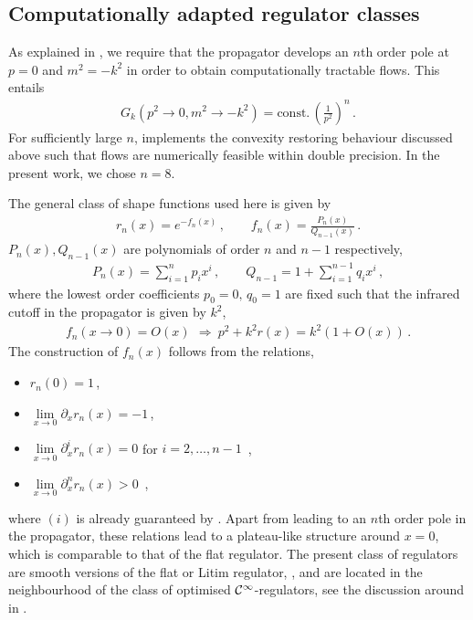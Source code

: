 \documentclass[aps,twocolumn,prd,superscriptaddress]{revtex4-2}
\begin{document}
\subsection{Computationally adapted regulator classes} 
\label{app:CompRegs}

As explained in , we require that the propagator develops an $n$th order pole at $p=0$ and $m^2 = -k^2$ in order to obtain computationally tractable flows. This entails 
%
\begin{align}
G_k(p^2\to 0, m^2 \to -k^2) = \textrm{const.} \,\left(\frac{1}{p^2}\right)^n\,.
\label{eq:Propsingsn}
\end{align}
%
For sufficiently large $n$,  implements the convexity restoring behaviour discussed above such that flows are numerically feasible within double precision. In the present work, we chose $n=8$. 

The general class of shape functions used here is given by
%
	\begin{align}
	r_n(x) = e^{-f_n(x)}\,, \qquad f_n(x) = \frac{P_n(x)}{Q_{n-1}(x)}\,.
\label{eq:RationalExpShape}
\end{align}
%
$P_n(x), Q_{n-1}(x)$ are polynomials of order $n$ and $n-1$ respectively, 
%
\begin{align}
P_n(x) = \sum_{i=1}^{n}p_i x^i\,,\qquad Q_{n-1} = 1 + \sum_{i=1}^{n-1}q_i x^i\,,
\end{align}
%
where the lowest order coefficients $p_0=0,\, q_0 = 1$ are fixed such that the infrared cutoff in the propagator is given by $k^2$, 
%
	\begin{align}
	f_n(x\to 0) = O(x)\,\ \Rightarrow \ p^2 + k^2 r(x) = k^2\left(1 + O(x)\right) \,.
\label{eq:LimitPropx} 
\end{align}
%
The construction of $f_n(x)$ follows from the relations, 
%
	\begin{itemize}
	\item[(i)]  $r_n(0 ) = 1$\,,
	\item[(ii)]  $\lim\limits_{x\to 0}\partial_x r_n(x) = -1$\,,
	\item[(iii)] $\lim\limits_{x\to 0}\partial_x^i r_n(x)  = 0$ for $i = 2,\dots,n-1$ \,,
\item[(iv)] $\lim\limits_{x\to 0}\partial_x^n r_n(x)  > 0$  \,,
\end{itemize}
%
where $(i)$ is already guaranteed by . 
Apart from leading to an $n$th order pole in the propagator, these relations lead to a plateau-like structure around $x=0$, which is comparable to that of the flat regulator. The present class of regulators are smooth versions of the flat or Litim regulator, \cite{Litim:2000ci}, and are located in the neighbourhood of the class of optimised ${\cal C}^\infty$-regulators, see the discussion around  in . 
\end{document}

